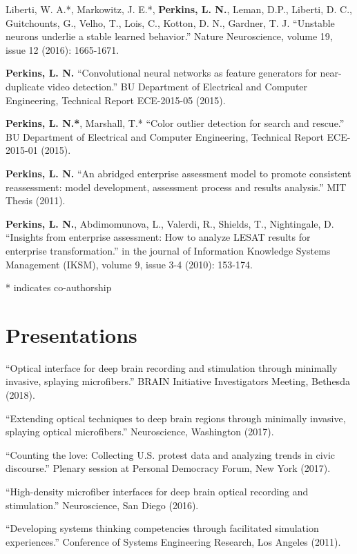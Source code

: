 Liberti, W. A.*, Markowitz, J. E.*, \textbf{Perkins, L. N.}, Leman, D.P., Liberti, D. C., Guitchounts, G., Velho, T., Lois, C., Kotton, D. N., Gardner, T. J. ``Unstable neurons underlie a stable learned behavior.'' Nature Neuroscience, volume 19, issue 12 (2016): 1665-1671.

\textbf{Perkins, L. N.} ``Convolutional neural networks as feature generators for near-duplicate video detection.'' BU Department of Electrical and Computer Engineering, Technical Report ECE-2015-05 (2015).

\textbf{Perkins, L. N.*}, Marshall, T.* ``Color outlier detection for search and rescue.'' BU Department of Electrical and Computer Engineering, Technical Report ECE-2015-01 (2015).

\textbf{Perkins, L. N.} ``An abridged enterprise assessment model to promote consistent reassessment: model development, assessment process and results analysis.'' MIT Thesis (2011).

\textbf{Perkins, L. N.}, Abdimomunova, L., Valerdi, R., Shields, T., Nightingale, D. ``Insights from enterprise assessment: How to analyze LESAT results for enterprise transformation.'' in the journal of Information Knowledge Systems Management (IKSM), volume 9, issue 3-4 (2010): 153-174.

* indicates co-authorship

\section*{Presentations}

``Optical interface for deep brain recording and stimulation through minimally invasive, splaying microfibers.'' BRAIN Initiative Investigators Meeting, Bethesda (2018).

``Extending optical techniques to deep brain regions through minimally invasive, splaying optical microfibers.'' Neuroscience, Washington (2017).

``Counting the love: Collecting U.S. protest data and analyzing trends in civic discourse.'' Plenary session at Personal Democracy Forum, New York (2017).

``High-density microfiber interfaces for deep brain optical recording and stimulation.'' Neuroscience, San Diego (2016).

``Developing systems thinking competencies through facilitated simulation experiences.'' Conference of Systems Engineering Research, Los Angeles (2011).

